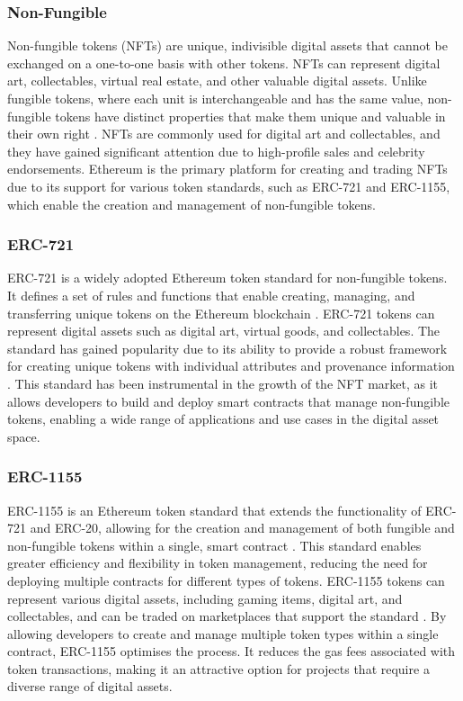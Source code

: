 \subsubsection{Non-Fungible}
Non-fungible tokens (NFTs) are unique, indivisible digital assets that cannot be exchanged on a one-to-one basis with other tokens. NFTs can represent digital art, collectables, virtual real estate, and other valuable digital assets. Unlike fungible tokens, where each unit is interchangeable and has the same value, non-fungible tokens have distinct properties that make them unique and valuable in their own right \cite{entriken2018erc721}. NFTs are commonly used for digital art and collectables, and they have gained significant attention due to high-profile sales and celebrity endorsements. Ethereum is the primary platform for creating and trading NFTs due to its support for various token standards, such as ERC-721 and ERC-1155, which enable the creation and management of non-fungible tokens.

\subsubsection{ERC-721}
ERC-721 is a widely adopted Ethereum token standard for non-fungible tokens. It defines a set of rules and functions that enable creating, managing, and transferring unique tokens on the Ethereum blockchain \cite{entriken2018erc721}. ERC-721 tokens can represent digital assets such as digital art, virtual goods, and collectables. The standard has gained popularity due to its ability to provide a robust framework for creating unique tokens with individual attributes and provenance information \cite{entriken2018erc721}. This standard has been instrumental in the growth of the NFT market, as it allows developers to build and deploy smart contracts that manage non-fungible tokens, enabling a wide range of applications and use cases in the digital asset space.

\subsubsection{ERC-1155}
ERC-1155 is an Ethereum token standard that extends the functionality of ERC-721 and ERC-20, allowing for the creation and management of both fungible and non-fungible tokens within a single, smart contract \cite{vogelsteller2015erc20}. This standard enables greater efficiency and flexibility in token management, reducing the need for deploying multiple contracts for different types of tokens. ERC-1155 tokens can represent various digital assets, including gaming items, digital art, and collectables, and can be traded on marketplaces that support the standard \cite{openzeppelinerc1155}. By allowing developers to create and manage multiple token types within a single contract, ERC-1155 optimises the process. It reduces the gas fees associated with token transactions, making it an attractive option for projects that require a diverse range of digital assets.

